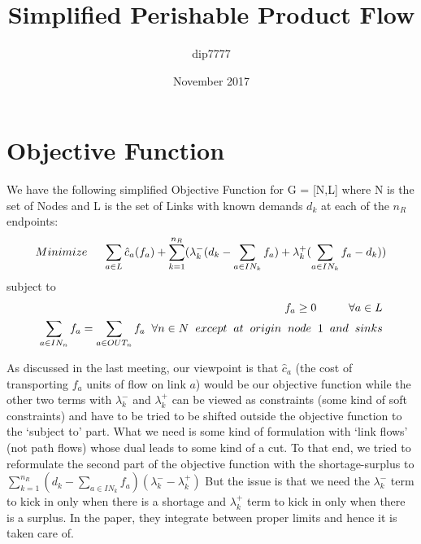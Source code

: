 \documentclass{article}
\title{Simplified Perishable Product Flow}
\author{dip7777}
\date{November 2017}
\begin{document}
\maketitle

\section{Objective Function}

We have the following simplified Objective Function for G = [N,L] where N is the set of Nodes and L is the set of Links with known demands $d_k$ at each of the $n_R$ endpoints:
$$Minimize \hspace{5mm} \sum_{a \in L}\hat{c}_a(f_a) + \sum_{k=1}^{n_R}(\lambda_k^-(d_k - \sum_{a \in IN_k}f_a) + \lambda_k^+(\sum_{a \in IN_k}f_a - d_k)) $$
subject to
\begin{align}
    f_a \geq 0 \hspace{10mm} \forall a \in L\\
    \sum_{a \in IN_n}f_a = \sum_{a \in OUT_n} f_a \hspace{2mm} \forall n \in N \hspace{2mm} except \hspace{2mm} at \hspace{2mm} origin \hspace{2mm} node \hspace{2mm} 1 \hspace{2mm} and \hspace{2mm} sinks
\end{align}

As discussed in the last meeting, our viewpoint is that $\hat{c}_a$ (the cost of transporting $f_a$ units of flow on link $a$) would be our objective function while the other two terms with $\lambda_k^-$ and $\lambda_k^+$ can be viewed as constraints (some kind of soft constraints) and have to be tried to be shifted outside the objective function to the `subject to' part. What we need is some kind of formulation with `link flows' (not path flows) whose dual leads to some kind of a cut. \break
To that end, we tried to reformulate the second part of the objective function with the shortage-surplus to $\sum_{k=1}^{n_R}(d_k - \sum_{a \in IN_k}f_a)(\lambda_k^- - \lambda_k^+)$ \break \break
But the issue is that we need the $\lambda_k^-$ term  to kick in only when there is a shortage and $\lambda_k^+$ term to kick in only when there is a surplus. In the paper, they integrate between proper limits and hence it is taken care of.
\end{document}
